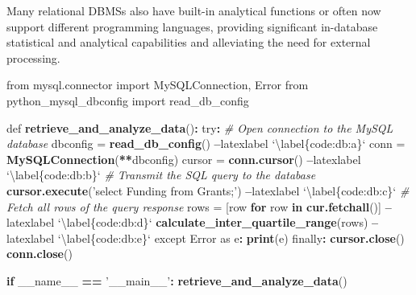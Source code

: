 \documentclass[]{krantz}
\newenvironment{Shaded}{\begin{snugshade}}{\end{snugshade}}
\newcommand{\KeywordTok}[1]{\textcolor[rgb]{0.13,0.29,0.53}{\textbf{#1}}}
\newcommand{\DataTypeTok}[1]{\textcolor[rgb]{0.13,0.29,0.53}{#1}}
\newcommand{\StringTok}[1]{\textcolor[rgb]{0.31,0.60,0.02}{#1}}
\newcommand{\CommentTok}[1]{\textcolor[rgb]{0.56,0.35,0.01}{\textit{#1}}}
\newcommand{\ControlFlowTok}[1]{\textcolor[rgb]{0.13,0.29,0.53}{\textbf{#1}}}
\newcommand{\OperatorTok}[1]{\textcolor[rgb]{0.81,0.36,0.00}{\textbf{#1}}}
\newcommand{\NormalTok}[1]{#1}
\begin{document}
Many relational DBMSs also have built-in analytical functions or often
now support different programming languages, providing significant
in-database statistical and analytical capabilities and alleviating the
need for external processing.

\begin{Shaded}
\begin{Highlighting}[]
\NormalTok{from mysql.connector import MySQLConnection, Error}
\NormalTok{from python_mysql_dbconfig import read_db_config}

\NormalTok{def }\KeywordTok{retrieve_and_analyze_data}\NormalTok{()}\OperatorTok{:}
\StringTok{    }\NormalTok{try}\OperatorTok{:}
\StringTok{        }\CommentTok{# Open connection to the MySQL database}
\StringTok{        }\NormalTok{dbconfig =}\StringTok{ }\KeywordTok{read_db_config}\NormalTok{() }\OperatorTok{--}\NormalTok{latexlabel }\StringTok{`}\DataTypeTok{\textbackslash{}label\{code:db:a\}}\StringTok{`}
\NormalTok{        conn =}\StringTok{ }\KeywordTok{MySQLConnection}\NormalTok{(}\OperatorTok{**}\NormalTok{dbconfig)}
\NormalTok{        cursor =}\StringTok{ }\KeywordTok{conn.cursor}\NormalTok{() }\OperatorTok{--}\NormalTok{latexlabel }\StringTok{`}\DataTypeTok{\textbackslash{}label\{code:db:b\}}\StringTok{`}
        \CommentTok{# Transmit the SQL query to the database}
        \KeywordTok{cursor.execute}\NormalTok{(}\StringTok{'select Funding from Grants;'}\NormalTok{) }\OperatorTok{--}\NormalTok{latexlabel }\StringTok{`}\DataTypeTok{\textbackslash{}label\{code:db:c\}}\StringTok{`}
        \CommentTok{# Fetch all rows of the query response}
\NormalTok{        rows =}\StringTok{ }\NormalTok{[row }\ControlFlowTok{for}\NormalTok{ row }\ControlFlowTok{in} \KeywordTok{cur.fetchall}\NormalTok{()] }\OperatorTok{--}\NormalTok{latexlabel }\StringTok{`}\DataTypeTok{\textbackslash{}label\{code:db:d\}}\StringTok{`}
        \KeywordTok{calculate_inter_quartile_range}\NormalTok{(rows) }\OperatorTok{--}\NormalTok{latexlabel }\StringTok{`}\DataTypeTok{\textbackslash{}label\{code:db:e\}}\StringTok{`}
\NormalTok{    except Error as e}\OperatorTok{:}
\StringTok{        }\KeywordTok{print}\NormalTok{(e)}
\NormalTok{    finally}\OperatorTok{:}
\StringTok{        }\KeywordTok{cursor.close}\NormalTok{()}
        \KeywordTok{conn.close}\NormalTok{()}

\ControlFlowTok{if}\NormalTok{ __name__ }\OperatorTok{==}\StringTok{ '__main__'}\OperatorTok{:}
\StringTok{    }\KeywordTok{retrieve_and_analyze_data}\NormalTok{()}
\end{Highlighting}
\end{Shaded}
\end{document}
